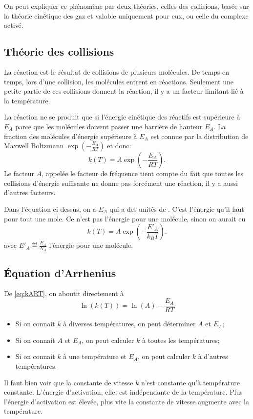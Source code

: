 On peut expliquer ce phénomène par deux théories,
celles des collisions, basée sur la théorie cinétique des gaz et
valable uniquement pour eux, ou celle du complexe activé.

\subsection{Théorie des collisions}
La réaction est le résultat de collisions de plusieurs molécules.
De temps en temps, lors d'une collision, les molécules entrent en réactions.
Seulement une petite partie de ces collisions donnent la réaction,
il y a un facteur limitant lié à la température.

La réaction ne se produit que si l'énergie cinétique des réactifs est
supérieure à $E_A$ parce que les molécules
doivent passer une barrière de hauteur $E_A$.
La fraction des molécules d'énergie supérieure à
$E_A$ est connue par la distribution de Maxwell Boltzmann
$\exp \left(-\frac{E_A}{RT}\right)$ et donc:
\begin{equation}
  \label{eq:kART}
  k(T) = A \exp \left(-\frac{E_A}{RT}\right).
\end{equation}
Le facteur $A$, appelée le facteur de fréquence tient compte du fait
que toutes les collisions d'énergie suffisante ne donne pas
forcément une réaction, il y a aussi d'autres facteurs.

\begin{myrem}
  Dans l'équation ci-dessus, on a $E_A$ qui a des unités de \joule\per\mole.
  C'est l'énergie qu'il faut pour tout une mole.
  Ce n'est pas l'énergie pour une molécule,
  sinon on aurait eu
  \[ k(T) = A \exp \left(-\frac{E'_A}{k_BT}\right). \]
  avec $E'_A \eqdef \frac{E_A}{N_A}$ l'énergie pour une molécule.
\end{myrem}

\subsection{Équation d'Arrhenius}
De \eqref{eq:kART}, on aboutit directement à
\[ \ln(k(T)) = \ln(A)-\frac{E_A}{RT} \]
\begin{itemize}
  \item Si on connait $k$ à diverses températures,
    on peut déterminer $A$ et $E_A$;
  \item Si on connait $A$ et $E_A$,
    on peut calculer $k$ à toutes les températures;
  \item Si on connait $k$ à une température et $E_A$,
    on peut calculer $k$ à d'autres températures.
\end{itemize}
Il faut bien voir que la constante de vitesse $k$
n'est constante qu'à température constante.
L'énergie d'activation, elle, est indépendante de la température.
Plus l'énergie d'activation est élevée,
plus vite la constante de vitesse augmente
avec la température.

